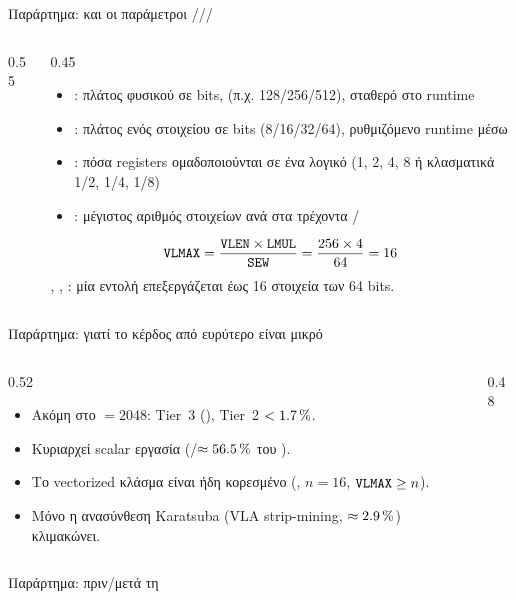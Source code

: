 \begin{frame}{Παράρτημα:  και οι παράμετροι \VLEN/\SEW/\LMUL/\VLMAX}
  \begin{columns}[T,onlytextwidth]
    \begin{column}{0.55\textwidth}
      \resizebox{\linewidth}{!}{}
    \end{column}
    \begin{column}{0.45\textwidth}
      \footnotesize
      \begin{itemize}
        \item \HL{\VLEN}: πλάτος φυσικού  σε bits,  (π.χ. 128/256/512), σταθερό στο runtime
        \item \HL{\SEW}: πλάτος ενός στοιχείου σε bits (8/16/32/64), ρυθμιζόμενο runtime μέσω 
        \item \HL{\LMUL}: πόσα registers ομαδοποιούνται σε ένα λογικό  (1, 2, 4, 8 ή κλασματικά 1/2, 1/4, 1/8)
        \item \HL{\VLMAX}: μέγιστος αριθμός στοιχείων ανά  στα τρέχοντα \SEW/\LMUL
      \end{itemize}
      \vspace{0.4em}
      \[ \texttt{VLMAX} = \frac{\texttt{VLEN} \times \texttt{LMUL}}{\texttt{SEW}} = \frac{256 \times 4}{64} = 16 \]
      {\scriptsize {}, , : μία εντολή επεξεργάζεται έως 16 στοιχεία των 64 bits.}
    \end{column}
  \end{columns}
\end{frame}


\begin{frame}{Παράρτημα: γιατί το κέρδος από ευρύτερο \VLEN είναι μικρό}
  \begin{columns}[c,onlytextwidth]
    \begin{column}{0.52\textwidth}
      \footnotesize
      \begin{itemize}
        \item Ακόμη στο \VLEN$=\num{2048}$: Tier~3  (), Tier~2 $<\SI{1.7}{\percent}$.
        \item Κυριαρχεί scalar εργασία (/\Zbb $\approx\SI{56.5}{\percent}$ του \KEM).
        \item Το vectorized κλάσμα είναι ήδη κορεσμένο (, $n=\num{16}$, $\texttt{VLMAX} \ge n$).
        \item Μόνο η ανασύνθεση Karatsuba (VLA strip-mining, $\approx\SI{2.9}{\percent}$) κλιμακώνει.
      \end{itemize}
    \end{column}
    \begin{column}{0.48\textwidth}
      \centering
      \resizebox{\linewidth}{!}{}
    \end{column}
  \end{columns}
\end{frame}

\begin{frame}[fragile]{Παράρτημα: \clmul πριν/μετά τη \Zbc}
  \centering
  
\end{frame}
